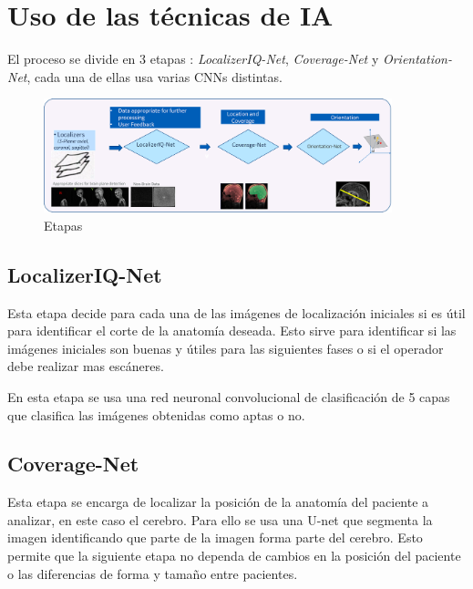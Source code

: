 \pagebreak
\section{Uso de las técnicas de IA}

    El proceso se divide en 3 etapas \cite{noauthor_ge_nodate-1}:
    \emph{LocalizerIQ-Net}, \emph{Coverage-Net} y \emph{Orientation-Net}, cada una de ellas usa varias 
    CNNs distintas.

     \begin{figure}[H]
        \centering
        \includegraphics[width=0.9\textwidth]{steps}
        \caption{Etapas \cite{noauthor_ge_nodate-1}}%
        \label{fig:steps}
     \end{figure}

    \subsection{LocalizerIQ-Net}
    
    Esta etapa decide para cada una de las imágenes de localización iniciales si es útil para
    identificar el corte de la anatomía deseada. Esto sirve para identificar si las imágenes iniciales
    son buenas y útiles para las siguientes fases o si el operador debe realizar mas escáneres.
    
    En esta etapa se usa una red neuronal convolucional de clasificación de 5 capas que clasifica
    las imágenes obtenidas como aptas o no.
    
    \subsection{Coverage-Net}
    
    Esta etapa se encarga de localizar la posición de la anatomía del paciente a analizar, en este caso
    el cerebro. Para ello se usa una U-net que segmenta la imagen identificando que parte de la imagen
    forma parte del cerebro. Esto permite que la siguiente etapa no dependa de cambios en la posición del
    paciente o las diferencias de forma y tamaño entre pacientes.
    
